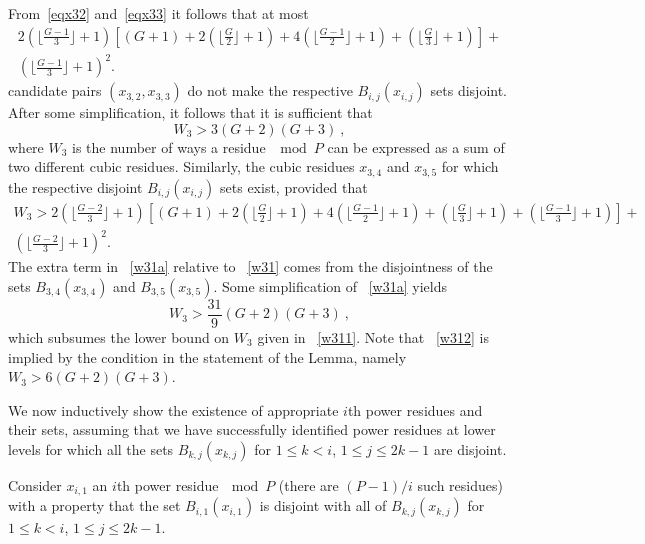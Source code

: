 From~\eqref{eqx32} and~\eqref{eqx33} it follows that at most
\begin{equation}\label{w31}\begin{array}{lll} 2 \left( \lfloor \frac{G-1}{3}\rfloor +1\right) \left[
(G+1)+2\left( \lfloor \frac{G}{2}\rfloor +1\right) +4\left(
\lfloor \frac{G-1}{2}\rfloor +1\right) + \left( \lfloor
\frac{G}{3}\rfloor +1\right)\right]+ \\\left( \lfloor
\frac{G-1}{3}\rfloor +1\right)^2.
\end{array}\end{equation}
candidate pairs $(x_{3,2},x_{3,3})$ do not make the respective
$B_{i,j}(x_{i,j})$ sets disjoint. After some simplification, it
follows that it is sufficient that
\begin{equation}\label{w311}
W_3 > 3 (G+2)(G+3)~,
\end{equation}
where $W_3$ is the number of ways a residue $\mod P$ can be
expressed as a sum of two different cubic residues. Similarly, the
cubic residues $x_{3,4}$ and $x_{3,5}$ for which the respective
disjoint $B_{i,j}(x_{i,j})$ sets  exist, provided that
\begin{equation}\label{w31a}\begin{array}{lll} W_3
> 2 \left( \lfloor \frac{G-2}{3}\rfloor +1\right)\left[
(G+1)+2\left( \lfloor \frac{G}{2}\rfloor +1\right) +4\left(
\lfloor \frac{G-1}{2}\rfloor +1\right)  +\left( \lfloor
\frac{G}{3}\rfloor
+1\right)+\left( \lfloor \frac{G-1}{3}\rfloor +1\right)\right]+\\
\left( \lfloor \frac{G-2}{3}\rfloor +1\right)^2.
\end{array}\end{equation} The extra term in ~\eqref{w31a} relative
to ~\eqref{w31} comes from the disjointness of the sets
$B_{3,4}(x_{3,4})$ and $B_{3,5}(x_{3,5})$.
 Some simplification of ~\eqref{w31a} yields
\begin{equation}\label{w312}
W_3 > \frac{31}{9} (G+2)(G+3)~,
\end{equation}
which subsumes the lower bound on $W_3$ given in ~\eqref{w311}.
Note that ~\eqref{w312} is implied by the condition in the
statement of the Lemma, namely $W_3 >6(G+2)(G+3)$.

We now inductively show the existence of appropriate $i$th power
residues and their sets, assuming that we have successfully
identified power residues at lower levels for which all the sets
$B_{k,j}(x_{k,j})$ for $1 \leq k <i$, $1 \leq j \leq 2k-1$ are
disjoint.

Consider $x_{i,1}$ an $i$th power residue$~\mod P$ (there are
$(P-1)/i$ such  residues) with a property that the set
$B_{i,1}(x_{i,1})$ is disjoint with all of $B_{k,j}(x_{k,j})$ for
$1 \leq k <i$, $1 \leq j \leq 2k-1$.


